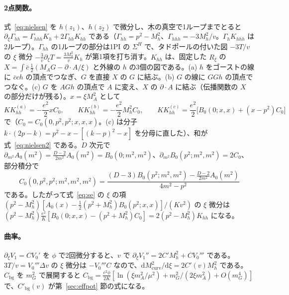 \documentclass[a4paper,10pt]{ltjsarticle}
\newcommand{\dd}{\mathrm{d}}
\begin{document}
\paragraph{2点関数。}式~\eqref{eq:nielsen} を $h(z_1)$、$h(z_2)$ で微分し、木の真空で1ループまでとると $\partial_\xi\Gamma_{hh}=\Gamma_{hhh}K_h+2\Gamma_{hh}K_{hh}$ である（$\Gamma_{hh}=p^2-M_h^2$、$\Gamma_{hhh}=-3M_h^2/v$。$\Gamma_hK_{hhh}$ は2ループ）。$\Gamma_{hh}$ の1ループの部分は1PI の $\Sigma^H$ で、タドポールの付いた図 $-3T/v$ の $\xi$ 微分 $-\frac3v\partial_\xi T=\frac{3M_h^2}vK_h$ が第1項を打ち消す。$K_{hh}$ は、固定した $R_\xi$ の $X=\int\bar c\,\frac12(M_AG-\partial\!\cdot\!A/\xi)$ と外線の $h$ の3個の図である。(a) $h$ をゴーストの線に $\bar cch$ の頂点でつなぎ、$G$ を直接 $X$ の $G$ に結ぶ。(b) $G$ の線に $GGh$ の頂点でつなぐ。(c) $G$ を $AGh$ の頂点で $A$ に変え、$X$ の $\partial\!\cdot\!A$ に結ぶ（伝播関数の $X$ の部分だけが残る）。$x=\xi M_A^2$ として
\begin{equation*}
KK_{hh}^{(a)}=-\frac{e^2}2xC_0,\qquad KK_{hh}^{(b)}=-\frac{e^2}2M_h^2C_0,\qquad
KK_{hh}^{(c)}=\frac{e^2}2\bigl[B_0(0;x,x)+(x-p^2)C_0\bigr]
\end{equation*}
で（$C_0=C_0(0,p^2,p^2;x,x,x)$。(c) は分子 $k\cdot(2p-k)=p^2-x-[(k-p)^2-x]$ を分母に直した）、和が式~\eqref{eq:nielsen2} である。$D$ 次元で $\partial_{m^2}A_0(m^2)=\frac{D-2}{2m^2}A_0(m^2)=B_0(0;m^2,m^2)$、$\partial_{m^2}B_0(p^2;m^2,m^2)=2C_0$、部分積分で
\begin{equation*}
C_0(0,p^2,p^2;m^2,m^2,m^2)=\frac{(D-3)B_0(p^2;m^2,m^2)-\frac{D-2}{2m^2}A_0(m^2)}{4m^2-p^2}
\end{equation*}
である。したがって式~\eqref{eq:se} の $\xi$ の項 $(p^2-M_h^2)[A_0(x)-\frac12(p^2+M_h^2)B_0(p^2;x,x)]/(Kv^2)$ の $\xi$ 微分は $(p^2-M_h^2)\frac{e^2}K[B_0(0;x,x)-(p^2+M_h^2)C_0]=2(p^2-M_h^2)K_{hh}$ になる。

\paragraph{曲率。}$\partial_\xi V_1=CV_0'$ を $\phi$ で2回微分すると、$v$ で $\partial_\xi V_1''=2C'M_h^2+CV_0'''$ である。$3T/v=V_0'''\Delta v$ の $\xi$ 微分は $-V_0'''C$ なので、$\dd M_{\mathrm{curv}}^2/\dd\xi=2C'(v)M_h^2$ である。$C_{\mathrm{bg}}$ を $m_G^2$ で展開すると $C_{\mathrm{bg}}=\frac{e^2\phi}{2K}[\ln(\xi m_A^2/\mu^2)+m_G^2/(2\xi m_A^2)+O(m_G^4)]$ で、$C'_{\mathrm{bg}}(v)$ が第~\ref{sec:effpot} 節の式になる。
\end{document}
